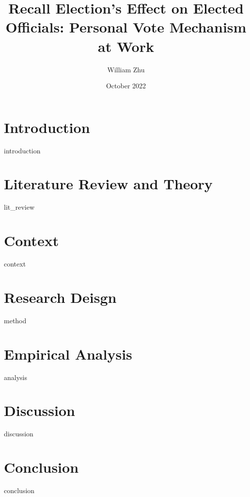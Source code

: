 \documentclass{article}
\title{Recall Election's Effect on Elected Officials: Personal Vote Mechanism at Work}
\author{William Zhu}
\date{October 2022}
\begin{document}
\maketitle

\section*{Introduction}
{introduction}

\newpage

\section*{Literature Review and Theory}
{lit_review}

\newpage

\section*{Context}
{context}

\newpage

\section*{Research Deisgn}
{method}

\newpage

\section*{Empirical Analysis}
{analysis}

\newpage

\section*{Discussion}
{discussion}

\newpage

\section*{Conclusion}
{conclusion}

\newpage
\end{document}
